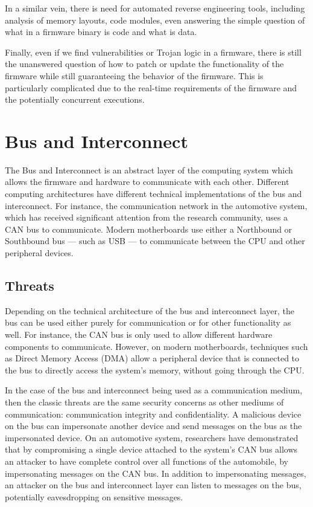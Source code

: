 \documentclass[11pt,letterpaper]{article}
\begin{document}
In a similar vein, there is need for automated reverse engineering tools,
including analysis of memory layouts, code modules, even answering the
simple question of what in a firmware binary is code and what is data.

Finally, even if we find vulnerabilities or Trojan logic in a
firmware, there is still the unanswered question of how to patch or
update the functionality of the firmware while still guaranteeing the
behavior of the firmware. This is particularly complicated due to the
real-time requirements of the firmware and the potentially concurrent
executions. 

\section{Bus and Interconnect}

The Bus and Interconnect is an abstract layer of the computing system
which allows the firmware and hardware to communicate with each other.
Different computing architectures have different technical
implementations of the bus and interconnect. For instance, the
communication network in the automotive system, which has received
significant attention from the research community, uses a CAN bus to
communicate. Modern motherboards use either a Northbound or Southbound
bus --- such as USB --- to communicate between the CPU and other peripheral devices.

\subsection{Threats}

Depending on the technical architecture of the bus and interconnect
layer, the bus can be used either purely for communication or for
other functionality as well. For instance, the CAN bus is only used to
allow different hardware components to communicate. However, on modern
motherboards, techniques such as Direct Memory Access (DMA) allow a
peripheral device that is connected to the bus to directly access the
system's memory, without going through the CPU. 

In the case of the bus and interconnect being used as a communication
medium, then the classic threats are the same security concerns as
other mediums of communication: communication integrity and
confidentiality. A malicious device on the bus can impersonate another
device and send messages on the bus as the impersonated device. On an
automotive system, researchers have demonstrated that by compromising
a single device attached to the system's CAN bus allows an attacker to
have complete control over all functions of the automobile, by
impersonating messages on the CAN bus. In addition to impersonating
messages, an attacker on the bus and interconnect layer can listen to
messages on the bus, potentially eavesdropping on sensitive messages.
\end{document}

